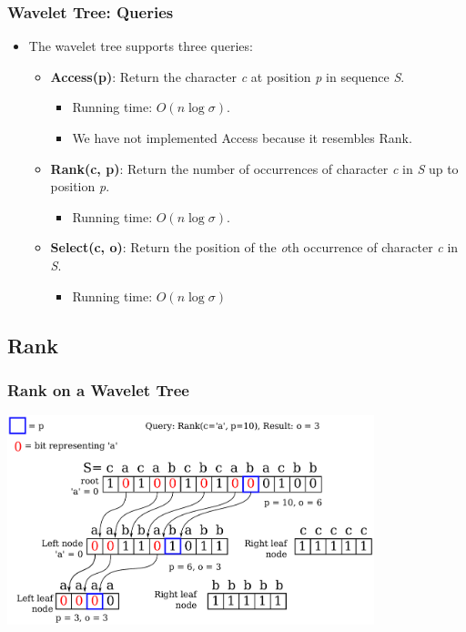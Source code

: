 \documentclass{beamer}
\begin{document}
\begin{frame}
\frametitle{Wavelet Tree: Queries}
\begin{itemize}
\item The wavelet tree supports three queries:
	\begin{itemize}
	\item \textbf{Access(p)}: Return the character \textit{c} at position \textit{p} in sequence \textit{S}.
		\begin{itemize}
		\item Running time: $O(n \log \sigma)$.
		\item We have not implemented Access because it resembles Rank.
		\end{itemize}
	\item \textbf{Rank(c, p)}: Return the number of occurrences of character \textit{c} in \textit{S} up to position \textit{p}.
		\begin{itemize}
		\item Running time: $O(n \log \sigma)$.
		\end{itemize}
	\item \textbf{Select(c, o)}: Return the position of the \textit{o}th occurrence of character \textit{c} in \textit{S}.
		\begin{itemize}
		\item Running time: $O(n \log \sigma)$
		\end{itemize}
	\end{itemize}
\end{itemize}

\end{frame}


\subsection{Rank}
\begin{frame}
\frametitle{Rank on a Wavelet Tree}
\begin{center}
	\center \includegraphics[width=0.8\textwidth]{RankDrawing}
\end{center}
\end{frame}
\end{document}
